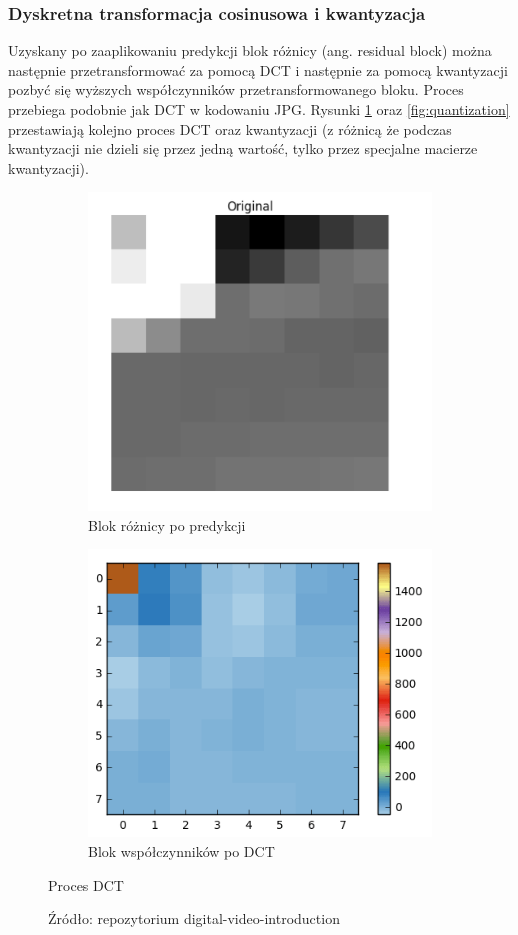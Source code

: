 \subsubsection{Dyskretna transformacja cosinusowa i kwantyzacja}

Uzyskany po zaaplikowaniu predykcji blok różnicy (ang. residual block) można następnie
przetransformować za pomocą DCT i następnie za pomocą kwantyzacji pozbyć się wyższych współczynników
przetransformowanego bloku. Proces przebiega podobnie jak DCT w kodowaniu JPG. Rysunki
\ref{fig:dct} oraz \ref{fig:quantization} przestawiają kolejno proces DCT oraz kwantyzacji (z
różnicą że podczas kwantyzacji nie dzieli się przez jedną wartość, tylko przez specjalne macierze kwantyzacji).

\begin{figure}[H]
    \centering
    \begin{subfigure}{0.48\linewidth}
        \centering
        \includegraphics[width=.7\linewidth]{img/rozdzial2/dct_original}
        \caption{Blok różnicy po predykcji}
    \end{subfigure}
    \begin{subfigure}{0.48\linewidth}
        \centering
        \includegraphics[width=.7\linewidth]{img/rozdzial2/dct_coefficients}
        \caption{Blok współczynników po DCT}
    \end{subfigure}
    \caption{Proces DCT}
    \caption*{Źródło: repozytorium digital-video-introduction \cite{digital_video_introduction}}
    \label{fig:dct}
\end{figure}

